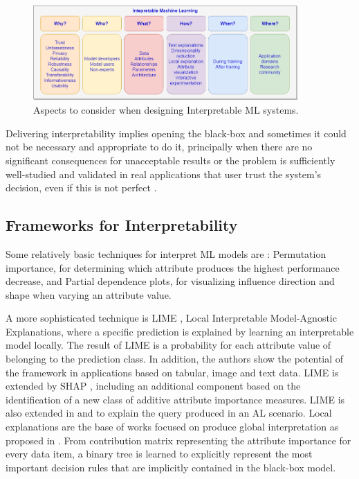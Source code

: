 \begin{figure}[ht]
 \centering
 \includegraphics[width=0.9\textwidth]{InterpretableML.png}
 \caption{Aspects to consider when designing Interpretable ML systems.}
 \label{fig:interpretableML}
\end{figure}

Delivering interpretability implies opening the black-box and sometimes it could not be necessary and appropriate to do it, principally when there are no significant consequences for unacceptable results or the problem is sufficiently well-studied and validated in real applications that user trust the system’s decision, even if this is not perfect \cite{Doshi-Velez2017c}.

\subsection{Frameworks for Interpretability}

Some relatively basic techniques for interpret ML models are \cite{Becker2018MachineExplainability}: Permutation importance, for determining which attribute produces the highest performance decrease, and Partial dependence plots, for visualizing influence direction and shape when varying an attribute value.

A more sophisticated technique is LIME \cite{Ribeiro2016}, Local Interpretable Model-Agnostic Explanations, where a specific prediction is explained by learning an interpretable model locally. The result of LIME is a probability for each attribute value of belonging to the prediction class. In addition, the authors show the potential of the framework in applications based on tabular, image and text data. LIME is extended by SHAP \cite{Lundberg2017APredictions}, including an additional component based on the identification of a new class of additive attribute importance measures. LIME is also extended in \cite{Teso2018} and \cite{Phillips2018InterpretableLearning} to explain the query produced in an AL scenario. Local explanations are the base of works focused on produce global interpretation as proposed in \cite{Yang2018}. From contribution matrix representing the attribute importance for every data item, a binary tree is learned to explicitly represent the most important decision rules that are implicitly contained in the black-box model. 

